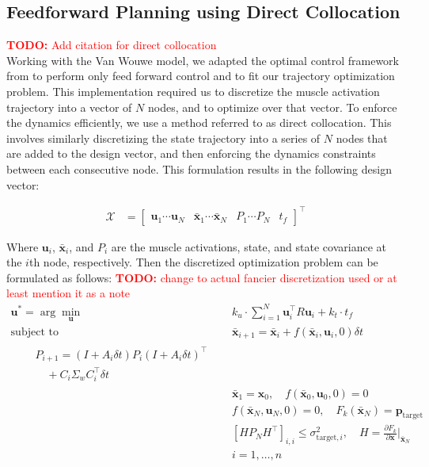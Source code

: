 \documentclass[letterpaper, 10pt, conference]{ieeeconf}
\newcommand{\todo}[1]{\textcolor{red}{\textbf{TODO:} #1}}
\begin{document}
\subsection{Feedforward Planning using Direct Collocation}
\todo{Add citation for direct collocation} \\
Working with the Van Wouwe model, we adapted the optimal control framework from \cite{stochastic_model} to perform only feed forward control and to fit our trajectory optimization problem. This implementation required us to discretize the muscle activation trajectory into a vector of $N$ nodes, and to optimize over that vector. To enforce the dynamics efficiently, we use a method referred to as direct collocation. This involves similarly discretizing the state trajectory into a series of $N$ nodes that are added to the design vector, and then enforcing the dynamics constraints between each consecutive node. This formulation results in the following design vector:

\begin{align}
    \mathcal{X} &= \begin{bmatrix}
        \mathbf{u}_1  \cdots \mathbf{u}_N & \mathbf{\bar{x}}_1 \cdots \mathbf{\bar{x}}_N & P_1 \cdots P_N & t_f
    \end{bmatrix}^\top
\end{align}

Where $\mathbf{u}_i$, $\mathbf{\bar{x}}_i$, and $P_i$ are the muscle activations, state, and state covariance at the $i$th node, respectively. Then the discretized optimization problem can be formulated as follows:
\todo{change to actual fancier discretization used or at least mention it as a note} \\

\begin{align}
    \mathbf{u}^* = \arg\min_{\mathbf{u}} &\quad k_u \cdot \sum_{i=1}^{N} \mathbf{u}_i^\top R \mathbf{u}_i + k_t \cdot t_f \label{eq:dcost} \\
    \text{subject to} &\quad \mathbf{\bar{x}}_{i+1} = \mathbf{\bar{x}}_i + f(\mathbf{\bar{x}}_i, \mathbf{u}_i, 0) \delta t \\
    \begin{split}
        &\quad P_{i+1} = (I + A_i \delta t)P_i(I + A_i \delta t)^\top \\
        &\quad \quad + C_i \Sigma_w C_i^\top \delta t
    \end{split} \label{test} \\
    &\quad \mathbf{\bar{x}}_1 = \mathbf{x}_0, \quad f(\mathbf{\bar{x}}_0, \mathbf{u}_0, 0) = 0 \\
    &\quad f(\mathbf{\bar{x}}_N, \mathbf{u}_N, 0) = 0, \quad F_k(\mathbf{\bar{x}}_N) = \mathbf{p}_{\text{target}} \label{eq:dtarget_constraint} \\
    &\quad [HP_NH^\top]_{i,i} \leq \sigma_{\text{target}, i}^2, \quad H = \frac{\partial F_k}{\partial \mathbf{x}}\bigg|_{\mathbf{\bar{x}}_N} \\
    &\quad i = 1, \ldots, n \label{eq:dtarget_variance_constraint}
\end{align}
\end{document}
